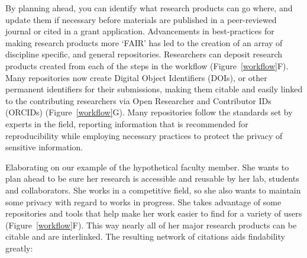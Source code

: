 \documentclass[10pt,letterpaper]{article}
\begin{document}
By planning ahead, you can identify what research products can go where, and
update them if necessary before materials are published in a peer-reviewed
journal or cited in a grant application. Advancements in best-practices
for making research products more `FAIR' has led to the creation of an array
of discipline specific, and general repositories\cite{PLOS2020}. Researchers
can deposit research products created from each of the steps in the workflow (Figure~\ref{workflow}F).
Many repositories now create Digital Object Identifiers (DOIs)\cite{DOI2020}, or
other permanent identifiers for their submissions, making them citable and
easily linked to the contributing researchers via Open Researcher and Contributor
IDs (ORCIDs)\cite{ORCID2020} (Figure~\ref{workflow}G). Many repositories follow the standards
set by experts in the field, reporting information that is recommended for
reproducibility while employing necessary practices to protect the privacy of
sensitive information.

Elaborating on our example of the hypothetical faculty member. She wants to plan 
ahead to be sure her research is accessible and reusable by her lab, students and 
collaborators. She works in a competitive field, so she also wants to maintain 
some privacy with regard to works in progress. She takes advantage of some
repositories and tools that help make her work easier to find for a variety of
users (Figure~\ref{workflow}F). This way nearly all of her major research products can be citable and
are interlinked. The resulting network of citations aids findability greatly:
\end{document}

